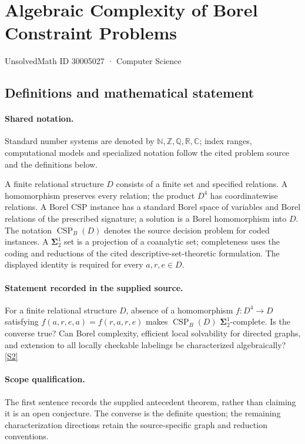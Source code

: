 \documentclass[11pt]{article}
\newcommand{\sref}[2]{\hyperlink{source:#1:#2}{[S#2]}}
\begin{document}
\setcounter{section}{30005026}
\section{Algebraic Complexity of Borel Constraint Problems}\label{30005027}
{\small\sffamily UnsolvedMath ID 30005027 · Computer Science}
\subsection{Definitions and mathematical statement}

\paragraph{Shared notation.}Standard number systems are denoted by $\mathbb N,\mathbb Z,\mathbb Q,\mathbb R,\mathbb C$; index ranges, computational models and specialized notation follow the cited problem source and the definitions below.


A finite relational structure $D$ consists of a finite set and specified relations. A homomorphism preserves every relation; the product $D^4$ has coordinatewise relations. A Borel CSP instance has a standard Borel space of variables and Borel relations of the prescribed signature; a solution is a Borel homomorphism into $D$. The notation $\operatorname{CSP}_B(D)$ denotes the source decision problem for coded instances. A $\boldsymbol{\Sigma}^1_2$ set is a projection of a coanalytic set; completeness uses the coding and reductions of the cited descriptive-set-theoretic formulation. The displayed identity is required for every $a,r,e\in D$.
\paragraph{Statement recorded in the supplied source.}
For a finite relational structure $D$, absence of a homomorphism $f:D^4\to D$ satisfying $f(a,r,e,a)=f(r,a,r,e)$ makes $\operatorname{CSP}_B(D)$ $\boldsymbol{\Sigma}^1_2$-complete. Is the converse true? Can Borel complexity, efficient local solvability for directed graphs, and extension to all locally checkable labelings be characterized algebraically? \sref{30005027}{2}
\paragraph{Scope qualification.}
The first sentence records the supplied antecedent theorem, rather than claiming it is an open conjecture. The converse is the definite question; the remaining characterization directions retain the source-specific graph and reduction conventions.
\end{document}
